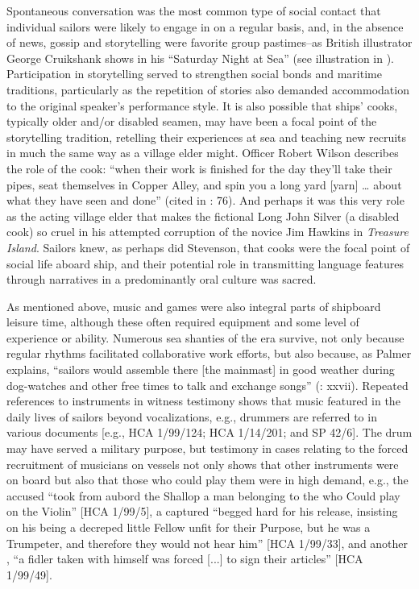 Spontaneous conversation was the most common type of social contact that individual sailors were likely to engage in on a regular basis, and, in the absence of news, gossip and storytelling were favorite group pastimes–as British illustrator George Cruikshank shows in his “Saturday Night at Sea” (see illustration in ). Participation in storytelling served to strengthen social bonds and maritime traditions, particularly as the repetition of stories also demanded accommodation to the original speaker’s performance style. It is also possible that ships’ cooks, typically older and/or disabled seamen, may have been a focal point of the storytelling tradition, retelling their experiences at sea and teaching new recruits in much the same way as a village elder might. Officer Robert Wilson describes the role of the cook: “when their work is finished for the day they’ll take their pipes, seat themselves in Copper Alley, and spin you a long yard [yarn] … about what they have seen and done” (cited in \citealt{AdkinsAdkins2008}: 76). And perhaps it was this very role as the acting village elder that makes the fictional Long John Silver (a disabled cook) so cruel in his attempted corruption of the novice Jim Hawkins in  \textit{Treasure Island}. Sailors knew, as perhaps did Stevenson, that cooks were the focal point of social life aboard ship, and their potential role in transmitting language features through narratives in a predominantly oral culture was sacred. 

As mentioned above, music and games were also integral parts of shipboard leisure time, although these often required equipment and some level of experience or ability. Numerous sea shanties of the era survive, not only because regular rhythms facilitated collaborative work efforts, but also because, as Palmer explains, “sailors would assemble there [the mainmast] in good weather during dog-watches and other free times to talk and exchange songs” (\citealt{Palmer1986}: xxvii). Repeated references to instruments in witness testimony shows that music featured in the daily lives of sailors beyond vocalizations, e.g., drummers are referred to in various documents [e.g., HCA 1/99/124; HCA 1/14/201; and SP 42/6]. The drum may have served a military purpose, but testimony in cases relating to the forced recruitment of musicians on  vessels not only  shows that other instruments were on board but also that those who could play them were in high demand, e.g., the accused “took from aubord the Shallop a man belonging to the  who Could play on the Violin” [HCA 1/99/5], a captured  “begged hard for his release, insisting on his being a decreped little Fellow unfit for their Purpose, but he was a Trumpeter, and therefore they would not hear him” [HCA 1/99/33], and another , “a fidler taken with himself was forced [...] to sign their articles” [HCA 1/99/49]. 

